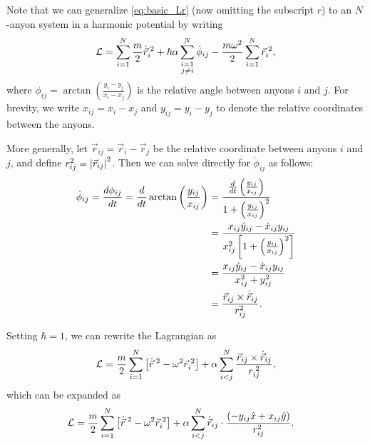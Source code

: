 Note that we can generalize \cref{eq:basic_Lr} (now omitting the subscript $r$) to an $N$-anyon system in a harmonic potential by writing
\begin{equation}
    \mathcal{L} = \sum_{i=1}^{N}\frac{m}{2}\dot{\vec{r}}_i^{\;2} + \hbar\alpha\sum_{\substack{i=1\\j\neq i}}^N\dot{\phi}_{ij} - \frac{m\omega^2}{2}\sum_{i=1}^{N}{\vec{r}_i}^{\;2},
\end{equation}
where $\phi_{ij} = \arctan\left( \frac{y_i-y_j}{x_i-x_j} \right)$ is the relative angle between anyons $i$ and $j$. For brevity, we write $x_{ij} = x_i-x_j$ and $y_{ij} = y_i-y_j$ to denote the relative coordinates between the anyons.

More generally, let $\vec{r}_{ij} = \vec{r}_i - \vec{r}_j$ be the relative coordinate between anyons $i$ and $j$, and define $r_{ij}^2 = \left|{\vec{r}_{ij}}\right|^2$. Then we can solve directly for $\dot{\phi}_{ij}$ as follows:
\begin{align*}
    \dot{\phi}_{ij} = \frac{d\phi_{ij}}{dt} = \frac{d}{dt}\arctan\left( \frac{y_{ij}}{x_{ij}} \right)
        &= \frac{\frac{d}{dt}\left( \frac{y_{ij}}{x_{ij}} \right)}{1+{\left( \frac{y_{ij}}{x_{ij}} \right)}^2} \\
        &= \frac{x_{ij}\dot{y}_{ij} - \dot{x}_{ij}y_{ij}}{x_{ij}^2\left[ 1+{\left( \frac{y_{ij}}{x_{ij}} \right)}^2 \right]} \\
        &= \frac{x_{ij}\dot{y}_{ij} - \dot{x}_{ij}y_{ij}}{x_{ij}^2 + y_{ij}^2} \\
        &= \frac{\vec{r}_{ij}\times\dot{\vec{r}}_{ij}}{r_{ij}^2}.
\end{align*}

Setting $\hbar=1$, we can rewrite the Lagrangian as~\cite{Date2003}
\begin{equation}
    \mathcal{L} = \frac{m}{2}\sum_{i=1}^{N}\left[ \dot{\vec{r}}^{\;2} - \omega^2\vec{r}_i^{\;2} \right] + \alpha\sum_{i<j}^{N}\frac{\vec{r}_{ij}\times\dot{\vec{r}}_{ij}}{{r}_{ij}^{\;2}},\label{eq:compact_L}
\end{equation}
which can be expanded as
\begin{align}
    \mathcal{L} &= \frac{m}{2}\sum_{i=1}^{N}\left[ \dot{\vec{r}}^{\;2} - \omega^2\vec{r}_i^{\;2} \right] + \alpha\sum_{i<j}^{N}\dot{\vec{r}}_{ij}\cdot\frac{\left( -y_{ij}\hat{x} + x_{ij}\hat{y} \right)}{r_{ij}^2}.\label{eq:L_with_A}
\end{align}


